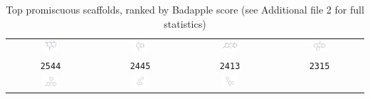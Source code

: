 \begin{table}
\caption{Top promiscuous scaffolds, ranked by Badapple score (see Additional file 2 for full statistics)}
\begin{center}
\begin{tabular}{ |c|c|c|c| } 
\hline
\includegraphics[align=t,width=0.2\textwidth]{data/badapple/Fig2_scaf_01.png} 
& \includegraphics[align=t,width=0.2\textwidth]{data/badapple/Fig2_scaf_02.png}
& \includegraphics[align=t,width=0.2\textwidth]{data/badapple/Fig2_scaf_03.png}
& \includegraphics[align=t,width=0.2\textwidth]{data/badapple/Fig2_scaf_04.png} \\
\texttt{2544} & \texttt{2445} & \texttt{2413} & \texttt{2315} \\
\hline
\includegraphics[align=t,width=0.2\textwidth]{data/badapple/Fig2_scaf_05.png} 
& \includegraphics[align=t,width=0.2\textwidth]{data/badapple/Fig2_scaf_06.png}
& \includegraphics[align=t,width=0.2\textwidth]{data/badapple/Fig2_scaf_07.png}

\end{tabular}
\end{center}
\end{table}
